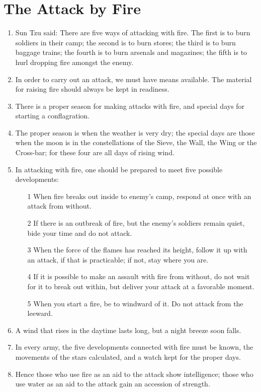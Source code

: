 \documentclass[oneside]{book}
\begin{document}
\chapter{The Attack by Fire}
\begin{enumerate}
	\item Sun Tzu said: There are five ways of attacking with fire. The first is to burn soldiers in their camp; the second is to burn stores; the third is to burn baggage trains; the fourth is to burn arsenals and magazines; the fifth is to hurl dropping fire amongst the enemy.
	\item In order to carry out an attack, we must have means available. The material for raising fire should always be kept in readiness.
	\item There is a proper season for making attacks with fire, and special days for starting a conflagration.
	\item The proper season is when the weather is very dry; the special days are those when the moon is in the constellations of the Sieve, the Wall, the Wing or the Cross-bar; for these four are all days of rising wind.
	\item In attacking with fire, one should be prepared to meet five possible developments:
	\begin{enumerate}
		\item[1] When fire breaks out inside to enemy's camp, respond at once with an attack from without.
		\item[2] If there is an outbreak of fire, but the enemy's soldiers remain quiet, bide your time and do not attack.
		\item[3] When the force of the flames has reached its height, follow it up with an attack, if that is practicable; if not, stay where you are.
		\item[4] If it is possible to make an assault with fire from without, do not wait for it to break out within, but deliver your attack at a favorable moment.
		\item[5] When you start a fire, be to windward of it. Do not attack from the leeward.
	\end{enumerate}
	\item A wind that rises in the daytime lasts long, but a night breeze soon falls.
	\item In every army, the five developments connected with fire must be known, the movements of the stars calculated, and a watch kept for the proper days.
	\item Hence those who use fire as an aid to the attack show intelligence; those who use water as an aid to the attack gain an accession of strength.

\end{enumerate}
\end{document}
